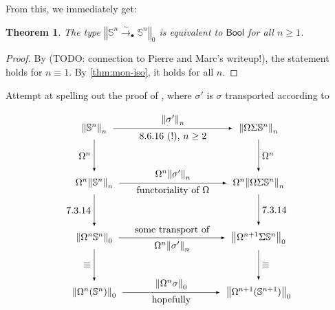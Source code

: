 \documentclass[11pt,a4paper,oneside,reqno]{amsart}
\newtheorem{theorem}{Theorem}
\theoremstyle{definition}
\theoremstyle{remark}
\newcommand{\sph}[1]{{\mathbb S}^{#1}}
\newcommand{\trunc}[2]{\mathopen{}\left\Vert #2\right\Vert_{#1}\mathclose{}}
\begin{document}
From this, we immediately get:

\begin{theorem} \label{thm:Sn-bool}
 The type
 $\trunc 0 {\sph n \xrightarrow{\sim}_\bullet \sph n}$
is equivalent to $\mathsf{Bool}$ for all $n \geq 1$.
\end{theorem}
\begin{proof}
 By (TODO: connection to Pierre and Marc's writeup!), the statement holds for $n \equiv 1$.
 By \cref{thm:mon-iso}, it holds for all $n$.
\end{proof}


Attempt at spelling out the proof of \cite[8.6.15]{HoTT},
where $\sigma'$ is $\sigma$ transported according to 
\cite[7.3.15]{HoTT}


\begin{equation} \label{eq:wants-to-commute}
\begin{tikzpicture}[x=6cm,y=-2cm,baseline=(current bounding box.center)]
 \tikzset{arrow/.style={shorten >=0.1cm,shorten <=.1cm,-latex}}

 \node (UL) at (0,0) {$\trunc n {\sph n}$};
 \node (UR) at (1,0) {$\trunc n {\Omega\Sigma \sph n}$};
 \node (mL) at (0,1) {$\Omega^n \trunc n {\sph n}$};
 \node (mR) at (1,1) {$\Omega^n \trunc n {\Omega\Sigma \sph n}$};
 

 \draw[arrow] (UL) to node [above] {$\trunc n {\sigma'}$} 
                      node [below] {8.6.16 (!), $n\geq 2$} (UR);
 \draw[arrow] (UL) to node [left] {$\Omega^n$} (mL);
 \draw[arrow] (UR) to node [right] {$\Omega^n$} (mR);
 \draw[arrow] (mL) to node [above] {$\Omega^n \trunc n {\sigma'}$} node [below] {functoriality of $\Omega$} (mR);


 \node (ML) at (0,2) {$\trunc 0 {\Omega^n \sph n}$};
 \node (MR) at (1,2) {$\trunc 0 {\Omega^{n+1}\Sigma \sph n}$}; 
 \draw[arrow] (mL) to node [left] {7.3.14} (ML);
 \draw[arrow] (mR) to node [right] {7.3.14} (MR);
 \draw[arrow] (ML) to node [below] {$\Omega^n \trunc n {\sigma'}$} node [above] {some transport of} (MR);

 \node (DL) at (0,3) {$\trunc 0 {\Omega^n(\sph n)}$}; 
 \node (DR) at (1,3) {$\trunc 0 {\Omega^{n+1}(\sph {n+1})}$}; 
 \draw[arrow] (ML) to node [left] {$\equiv$} (DL);
 \draw[arrow] (MR) to node [right] {$\equiv$} (DR); 
 \draw[arrow] (DL) to node [above] {$\trunc 0 {\Omega^n \sigma}$} node [below] {hopefully} (DR);

\end{tikzpicture}
\end{equation}
\end{document}
